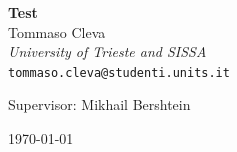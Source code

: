 \begin{titlepage}
    \centering

    \vspace*{2cm}

    {\Huge \bfseries 
    Test
    }\\[1.5cm]

    {\large
    Tommaso Cleva\\[0.3cm]
    \textit{University of Trieste and SISSA}\\[0.3cm]
    \texttt{tommaso.cleva@studenti.units.it}
    }

    \vspace{2cm}

    {\large
    Supervisor: Mikhail Bershtein
    }

    
    \vfill 
    
    {\large \today}


\end{titlepage}